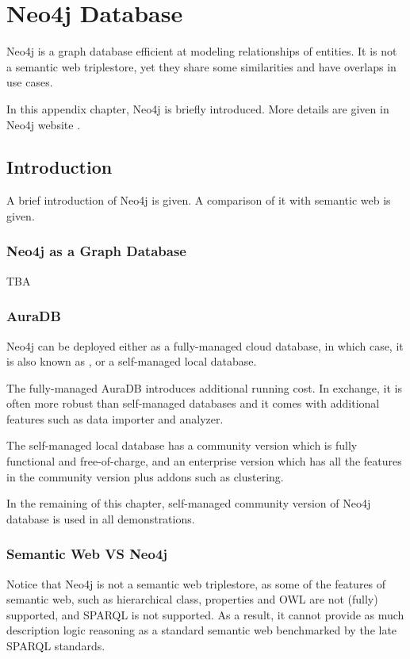\chapter{Neo4j Database}

Neo4j is a graph database efficient at modeling relationships of entities. It is not a semantic web triplestore, yet they share some similarities and have overlaps in use cases.

In this appendix chapter, Neo4j is briefly introduced. More details are given in Neo4j website \cite{neo4j2026}. 

\section{Introduction}

A brief introduction of Neo4j is given. A comparison of it with semantic web is given.

\subsection{Neo4j as a Graph Database}

TBA

\subsection{AuraDB}

Neo4j can be deployed either as a fully-managed cloud database, in which case, it is also known as , or a self-managed local database. 

The fully-managed AuraDB introduces additional running cost. In exchange, it is often more robust than self-managed databases and it comes with additional features such as data importer and analyzer.

The self-managed local database has a community version which is fully functional and free-of-charge, and an enterprise version which has all the features in the community version plus addons such as clustering.

In the remaining of this chapter, self-managed community version of Neo4j database is used in all demonstrations.

\subsection{Semantic Web VS Neo4j}

Notice that Neo4j is not a semantic web triplestore, as some of the features of semantic web, such as hierarchical class, properties and OWL are not (fully) supported, and SPARQL is not supported. As a result, it cannot provide as much description logic reasoning as a standard semantic web benchmarked by the late SPARQL standards.


